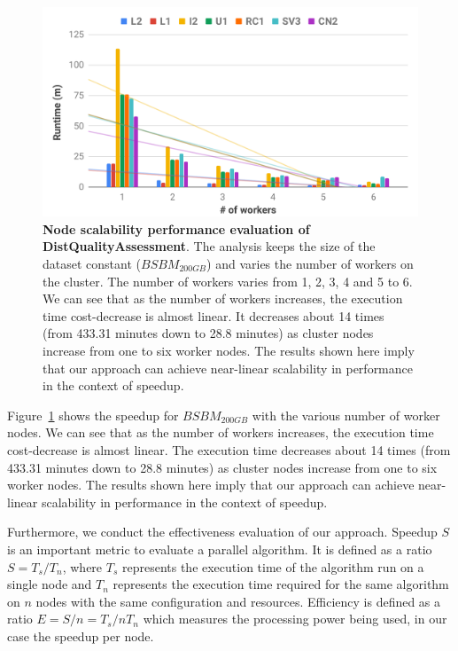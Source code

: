 \begin{figure}
\centering
  \includegraphics[width=1.0\columnwidth]{images/5_distqualityassessment/distqualityassessment-node-scalability.pdf}
    \caption{\textbf{Node scalability performance evaluation of DistQualityAssessment}.
    The analysis keeps the size of the dataset constant ($BSBM_{200GB}$) and varies the number of workers on the cluster.
    The number of workers varies from 1, 2, 3, 4 and 5 to 6.
    We can see that as the number of workers increases, the execution time cost-decrease is almost linear. 
    It decreases about 14 times (from 433.31 minutes down to 28.8 minutes) as cluster nodes increase from one to six worker nodes. The results shown here imply that our approach can achieve near-linear scalability in performance in the context of speedup.}
    \label{fig:distqualityassessment-node-scalability}
\end{figure}

Figure~\ref{fig:distqualityassessment-node-scalability} shows the speedup for $BSBM_{200GB}$ with the various number of worker nodes.
We can see that as the number of workers increases, the execution time cost-decrease is almost linear.
The execution time decreases about 14 times (from 433.31 minutes down to 28.8 minutes) as cluster nodes increase from one to six worker nodes.
The results shown here imply that our approach can achieve near-linear scalability in performance in the context of speedup.

Furthermore, we conduct the effectiveness evaluation of our approach.
Speedup $S$ is an important metric to evaluate a parallel algorithm.
It is defined as a ratio $S=T_s/T_n$, where $T_s$ represents the execution time of the algorithm run on a single node and $T_n$ represents the execution time required for the same algorithm on $n$ nodes with the same configuration and resources.
Efficiency is defined as a ratio $E = S/n =T_s/n T_n$ which measures the processing power being used, in our case the speedup per node.

